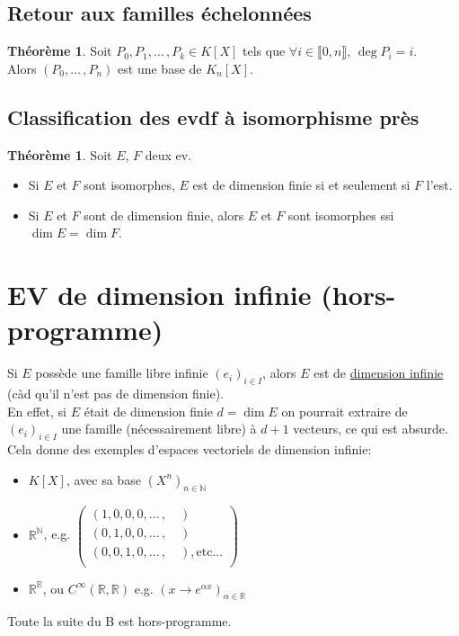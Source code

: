 \documentclass[10pt,a4paper]{article}
\theoremstyle{definition}
\newtheorem{theorem}[proposition]{Théorème}
\begin{document}
\subsection{Retour aux familles échelonnées}
\begin{theorem}
Soit $P_0, P_1, ...\, , P_k \in K[X]$ tels que $\forall i \in \llbracket 0, n \rrbracket$, $\deg P_i = i$. \\
Alors $(P_0, ...\, , P_n)$ est une base de $K_n[X]$. 
\end{theorem}

\subsection{Classification des evdf à isomorphisme près}
\begin{theorem}
Soit $E$, $F$ deux ev.
\begin{itemize}
\item Si $E$ et $F$ sont isomorphes, $E$ est de dimension finie si et seulement si $F$ l'est.
\item Si $E$ et $F$ sont de dimension finie, alors $E$ et $F$ sont isomorphes ssi $\dim E = \dim F$.
\end{itemize}
\end{theorem}

\section{EV de dimension infinie (hors-programme)}
Si $E$ possède une famille libre infinie $(e_i)_{i \in I}$, alors $E$ est de \uline{dimension infinie} (càd qu'il n'est pas de dimension finie). \\
En effet, si $E$ était de dimension finie $d = \dim E$ on pourrait extraire de $(e_i)_{i \in I}$ une famille (nécessairement libre) à $d + 1$ vecteurs, ce qui est absurde. Cela donne des exemples d'espaces vectoriels de dimension infinie:
\begin{itemize}
\item $K[X]$, avec sa base $(X^n)_{n \in \mathbb{N}}$
\item $\mathbb{R}^\mathbb{N}$, e.g. $\begin{pmatrix}
(1, 0, 0, 0, ... \, , \hspace{1em} ) \phantom{, etc...} \\
(0, 1, 0, 0, ... \, , \hspace{1em} ) \phantom{, etc...} \\
(0, 0, 1, 0, ... \, , \hspace{1em} ), \text{etc...} \\
\end{pmatrix}$
\item $\mathbb{R}^\mathbb{R}$, ou $C^\infty (\mathbb{R}, \mathbb{R})$ e.g. $(x \to e^{\alpha x})_{\alpha \in \mathbb{R}}$
\end{itemize}
Toute la suite du B est hors-programme.
\end{document}
